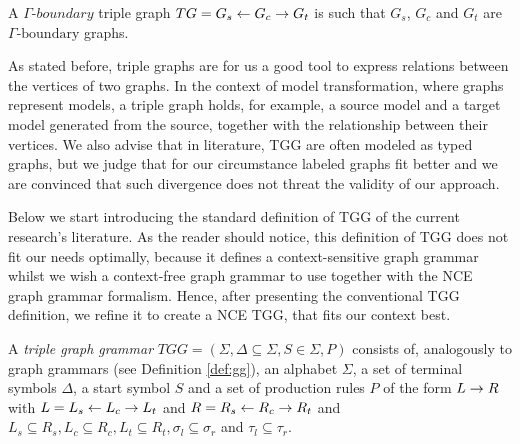 \begin{definition}
	A $\mathit{\Gamma\textit{-boundary}}$ triple graph $TG = G_s \overset{}{\leftarrow} G_c \overset{}{\rightarrow} G_t$ is such that $G_s$, $G_c$ and $G_t$ are $\Gamma\text{-boundary}$ graphs.
\end{definition}

As stated before, triple graphs are for us a good tool to express relations between the vertices of two graphs. In the context of model transformation, where graphs represent models, a triple graph holds, for example, a source model and a target model generated from the source, together with the relationship between their vertices. We also advise that in literature, TGG are often modeled as typed graphs, but we judge that for our circumstance labeled graphs fit better and we are convinced that such divergence does not threat the validity of our approach.

Below we start introducing the standard definition of TGG of the current research's literature. As the reader should notice, this definition of TGG does not fit our needs optimally, because it defines a context-sensitive graph grammar whilst we wish a context-free graph grammar to use together with the NCE graph grammar formalism. Hence, after presenting the conventional TGG definition, we refine it to create a NCE TGG, that fits our context best.

\begin{definition}
	\label{def:stgg}
	A \emph{triple graph grammar} $TGG = (\Sigma, \Delta \subseteq \Sigma, S \in \Sigma, P)$ consists of, analogously to graph grammars (see Definition \ref{def:gg}), an alphabet $\Sigma$, a set of terminal symbols $\Delta$, a start symbol $S$ and a set of production rules $P$ of the form $L \to R$ with $L = L_s \overset{}{\leftarrow} L_c \overset{}{\rightarrow} L_t$ and $R = R_s \overset{}{\leftarrow} R_c \overset{}{\rightarrow} R_t$  and $L_s \subseteq R_s, L_c \subseteq R_c, L_t \subseteq R_t, \sigma_l \subseteq \sigma_r$ and $\tau_l \subseteq \tau_r$.
\end{definition}

